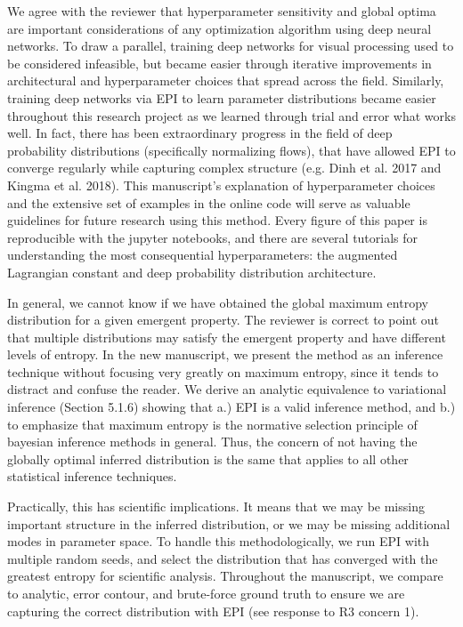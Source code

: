 \documentclass[11pt,a4paper]{article}
\begin{document}
We agree with the reviewer that hyperparameter sensitivity and global optima are important considerations of any optimization algorithm using deep neural networks.  To draw a parallel, training deep networks for visual processing used to be considered infeasible, but became easier through iterative improvements in architectural and hyperparameter choices that spread across the field.  
Similarly, training deep networks via EPI to learn parameter distributions became easier throughout this research project as we learned through trial and error what works well.  
In fact, there has been extraordinary progress in the field of deep probability distributions (specifically normalizing flows), that have allowed EPI to converge regularly while capturing complex structure (e.g. Dinh et al. 2017 and Kingma et al. 2018).  
This manuscript's explanation of hyperparameter choices and the extensive set of examples in the online code will serve as valuable guidelines for future research using this method.
Every figure of this paper is reproducible with the jupyter notebooks, and there are several tutorials for understanding the most consequential hyperparameters: the augmented Lagrangian constant and deep probability distribution architecture.  

In general, we cannot know if we have obtained the global maximum entropy distribution for a given emergent property.  
The reviewer is correct to point out that multiple distributions may satisfy the emergent property and have different levels of entropy.  
In the new manuscript, we present the method as an inference technique without focusing very greatly on maximum entropy, since it tends to distract and confuse the reader.  
We derive an analytic equivalence to variational inference (Section 5.1.6) showing that a.) EPI is a valid inference method, and b.) to emphasize that maximum entropy is the normative selection principle of bayesian inference methods in general. 
Thus, the concern of not having the globally optimal inferred distribution is the same that applies to all other statistical inference techniques.

Practically, this has scientific implications.  
It means that we may be missing important structure in the inferred distribution, or we may be missing additional modes in parameter space.  
To handle this methodologically, we run EPI with multiple random seeds, and select the distribution that has converged with the greatest entropy for scientific analysis.
Throughout the manuscript, we compare to analytic, error contour, and brute-force ground truth to ensure we are capturing the correct distribution with EPI (see response to R3 concern 1).
\end{document}
